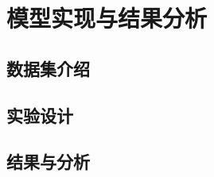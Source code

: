 \chapter[\hspace{0pt}模型实现与结果分析]{{\heiti{}\hspace{0pt}模型实现与结果分析}}\label{chapter4: 模型实现与结果分析}
\removelofgap
\removelotgap

\section[\hspace{-2pt}数据集介绍]{{\heiti{} \hspace{-8pt}数据集介绍}}\label{section4: 数据集介绍}

\section[\hspace{-2pt}实验设计]{{\heiti{} \hspace{-8pt}实验设计}}\label{section4: 实验设计}

\section[\hspace{-2pt}结果与分析]{{\heiti{} \hspace{-8pt}结果与分析}}\label{section4: 结果与分析}

